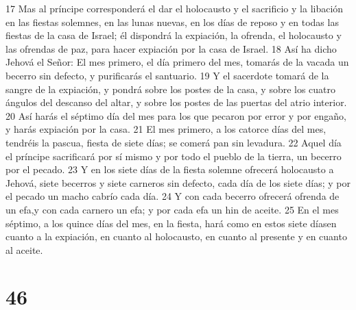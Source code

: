17 Mas al príncipe corresponderá el dar el holocausto y el sacrificio y la libación en las fiestas solemnes, en las lunas nuevas, en los días de reposo y en todas las fiestas de la casa de Israel; él dispondrá la expiación, la ofrenda, el holocausto y las ofrendas de paz, para hacer expiación por la casa de Israel.
18 Así ha dicho Jehová el Señor: El mes primero, el día primero del mes, tomarás de la vacada un becerro sin defecto, y purificarás el santuario.
19 Y el sacerdote tomará de la sangre de la expiación, y pondrá sobre los postes de la casa, y sobre los cuatro ángulos del descanso del altar, y sobre los postes de las puertas del atrio interior.
20 Así harás el séptimo día del mes para los que pecaron por error y por engaño, y harás expiación por la casa.
21 El mes primero, a los catorce días del mes, tendréis la pascua, fiesta de siete días; se comerá pan sin levadura. 
22 Aquel día el príncipe sacrificará por sí mismo y por todo el pueblo de la tierra, un becerro por el pecado.
23 Y en los siete días de la fiesta solemne ofrecerá holocausto a Jehová, siete becerros y siete carneros sin defecto, cada día de los siete días; y por el pecado un macho cabrío cada día.
24 Y con cada becerro ofrecerá ofrenda de un efa,y con cada carnero un efa; y por cada efa un hin de aceite.
25 En el mes séptimo, a los quince días del mes, en la fiesta, hará como en estos siete díasen cuanto a la expiación, en cuanto al holocausto, en cuanto al presente y en cuanto al aceite.

\chapter{46}

